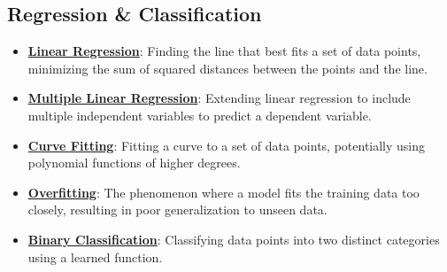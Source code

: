 \documentclass{article}%
\begin{document}
\subsection{Regression \& Classification}%
\label{subsec:RegressionClassification}%
\begin{itemize}[leftmargin=*]%
\item \href{https://purdue.brightspace.com/d2l/common/assets/pdfjs-d2l-dist/1.0.14-legacy/web/viewer.html?file=\%2Fcontent\%2Fenforced\%2F1095467-wl.202510.CS.24300.001\%2F05L2-ML Basics.pdf\%3Fou\%3D1095467\&lang=en-us\&container=d2l-fileviewer-rendered-pdf\&fullscreen=d2l-fileviewer-rendered-pdf-dialog\&height=667#page=6}{\textbf{Linear Regression}}: Finding the line that best fits a set of data points, minimizing the sum of squared distances between the points and the line.%
\item \href{https://purdue.brightspace.com/d2l/common/assets/pdfjs-d2l-dist/1.0.14-legacy/web/viewer.html?file=\%2Fcontent\%2Fenforced\%2F1095467-wl.202510.CS.24300.001\%2F05L2-ML Basics.pdf\%3Fou\%3D1095467\&lang=en-us\&container=d2l-fileviewer-rendered-pdf\&fullscreen=d2l-fileviewer-rendered-pdf-dialog\&height=667#page=11}{\textbf{Multiple Linear Regression}}: Extending linear regression to include multiple independent variables to predict a dependent variable.%
\item \href{https://purdue.brightspace.com/d2l/common/assets/pdfjs-d2l-dist/1.0.14-legacy/web/viewer.html?file=\%2Fcontent\%2Fenforced\%2F1095467-wl.202510.CS.24300.001\%2F05L2-ML Basics.pdf\%3Fou\%3D1095467\&lang=en-us\&container=d2l-fileviewer-rendered-pdf\&fullscreen=d2l-fileviewer-rendered-pdf-dialog\&height=667#page=13}{\textbf{Curve Fitting}}: Fitting a curve to a set of data points, potentially using polynomial functions of higher degrees.%
\item \href{https://purdue.brightspace.com/d2l/common/assets/pdfjs-d2l-dist/1.0.14-legacy/web/viewer.html?file=\%2Fcontent\%2Fenforced\%2F1095467-wl.202510.CS.24300.001\%2F05L2-ML Basics.pdf\%3Fou\%3D1095467\&lang=en-us\&container=d2l-fileviewer-rendered-pdf\&fullscreen=d2l-fileviewer-rendered-pdf-dialog\&height=667#page=14}{\textbf{Overfitting}}: The phenomenon where a model fits the training data too closely, resulting in poor generalization to unseen data.%
\item \href{https://purdue.brightspace.com/d2l/common/assets/pdfjs-d2l-dist/1.0.14-legacy/web/viewer.html?file=\%2Fcontent\%2Fenforced\%2F1095467-wl.202510.CS.24300.001\%2F05L2-ML Basics.pdf\%3Fou\%3D1095467\&lang=en-us\&container=d2l-fileviewer-rendered-pdf\&fullscreen=d2l-fileviewer-rendered-pdf-dialog\&height=667#page=20}{\textbf{Binary Classification}}: Classifying data points into two distinct categories using a learned function.%

\end{itemize}
\end{document}
